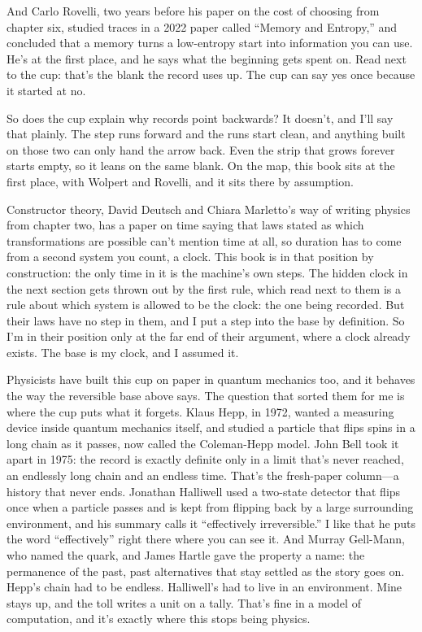 \documentclass[11pt,twoside]{article}
\theoremstyle{thielethm}
\theoremstyle{thieledef}
\theoremstyle{thieledef}
\theoremstyle{thieledef}
\theoremstyle{thielethm}
\theoremstyle{thieleobs}
\theoremstyle{thielethm}
\begin{document}
And Carlo Rovelli, two years before his paper on the cost of choosing from chapter six, studied traces in a 2022 paper called ``Memory and Entropy,'' and concluded that a memory turns a low-entropy start into information you can use. He's at the first place, and he says what the beginning gets spent on. Read next to the cup: that's the blank the record uses up. The cup can say yes once because it started at no.

So does the cup explain why records point backwards? It doesn't, and I'll say that plainly. The step runs forward and the runs start clean, and anything built on those two can only hand the arrow back. Even the strip that grows forever starts empty, so it leans on the same blank. On the map, this book sits at the first place, with Wolpert and Rovelli, and it sits there by assumption.

Constructor theory, David Deutsch and Chiara Marletto's way of writing physics from chapter two, has a paper on time saying that laws stated as which transformations are possible can't mention time at all, so duration has to come from a second system you count, a clock. This book is in that position by construction: the only time in it is the machine's own steps. The hidden clock in the next section gets thrown out by the first rule, which read next to them is a rule about which system is allowed to be the clock: the one being recorded. But their laws have no step in them, and I put a step into the base by definition. So I'm in their position only at the far end of their argument, where a clock already exists. The base is my clock, and I assumed it.

Physicists have built this cup on paper in quantum mechanics too, and it behaves the way the reversible base above says. The question that sorted them for me is where the cup puts what it forgets. Klaus Hepp, in 1972, wanted a measuring device inside quantum mechanics itself, and studied a particle that flips spins in a long chain as it passes, now called the Coleman-Hepp model. John Bell took it apart in 1975: the record is exactly definite only in a limit that's never reached, an endlessly long chain and an endless time. That's the fresh-paper column---a history that never ends. Jonathan Halliwell used a two-state detector that flips once when a particle passes and is kept from flipping back by a large surrounding environment, and his summary calls it ``effectively irreversible.'' I like that he puts the word ``effectively'' right there where you can see it. And Murray Gell-Mann, who named the quark, and James Hartle gave the property a name: the permanence of the past, past alternatives that stay settled as the story goes on. Hepp's chain had to be endless. Halliwell's had to live in an environment. Mine stays up, and the toll writes a unit on a tally. That's fine in a model of computation, and it's exactly where this stops being physics.
\end{document}
